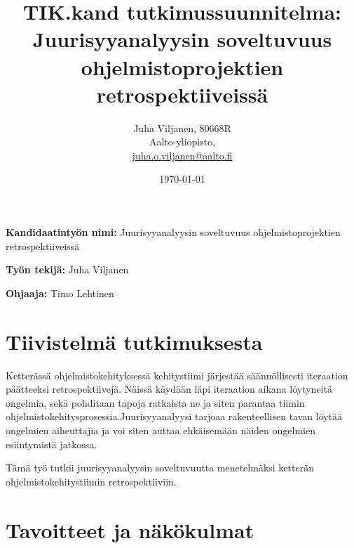 \documentclass[12pt,a4paper,finnish,oneside]{article}
\begin{document}

\title{TIK.kand tutkimussuunnitelma:\\[5mm]
Juurisyyanalyysin soveltuvuus ohjelmistoprojektien retrospektiiveissä}

\author{Juha Viljanen, 80668R\\
Aalto-yliopisto,\\
\url{juha.o.viljanen@aalto.fi}}

\date{\today}

\maketitle


\vspace{10mm}

%

\textbf{Kandidaatintyön nimi:} Juurisyyanalyysin soveltuvuus ohjelmistoprojektien retrospektiiveissä

\textbf{Työn tekijä:} Juha Viljanen

\textbf{Ohjaaja:} Timo Lehtinen


\section{Tiivistelmä tutkimuksesta}

Ketterässä ohjelmistokehityksessä kehitystiimi järjestää säännöllisesti iteraation päätteeksi retrospektiivejä. Näissä käydään läpi iteraation aikana löytyneitä ongelmia, sekä pohditaan tapoja ratkaista ne ja siten parantaa tiimin ohjelmistokehitysprosessia.Juurisyyanalyysi tarjoaa rakenteellisen tavan löytää ongelmien aiheuttajia ja voi siten auttaa ehkäisemään näiden ongelmien esiintymistä jatkossa. 

Tämä työ tutkii juurisyyanalyysin soveltuvuutta menetelmäksi ketterän ohjelmistokehitystiimin retrospektiiviin.

\section{Tavoitteet ja näkökulmat}
\end{document}
